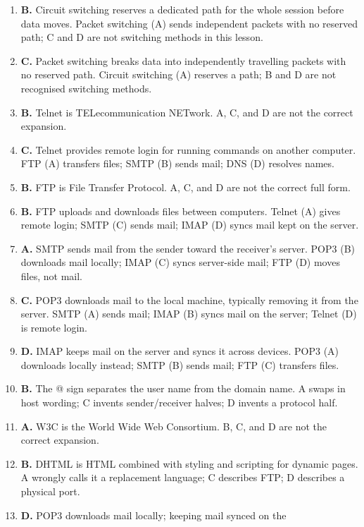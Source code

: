 \begin{enumerate}[label=\textbf{Q\arabic*.}, leftmargin=*]
\item \textbf{B.} Circuit switching reserves a dedicated path for the whole
  session before data moves. Packet switching (A) sends independent packets
  with no reserved path; C and D are not switching methods in this lesson.
\item \textbf{C.} Packet switching breaks data into independently travelling
  packets with no reserved path. Circuit switching (A) reserves a path;
  B and D are not recognised switching methods.
\item \textbf{B.} Telnet is TELecommunication NETwork. A, C, and D are not
  the correct expansion.
\item \textbf{C.} Telnet provides remote login for running commands on
  another computer. FTP (A) transfers files; SMTP (B) sends mail; DNS (D)
  resolves names.
\item \textbf{B.} FTP is File Transfer Protocol. A, C, and D are not the
  correct full form.
\item \textbf{B.} FTP uploads and downloads files between computers. Telnet
  (A) gives remote login; SMTP (C) sends mail; IMAP (D) syncs mail kept on
  the server.
\item \textbf{A.} SMTP sends mail from the sender toward the receiver's
  server. POP3 (B) downloads mail locally; IMAP (C) syncs server-side mail;
  FTP (D) moves files, not mail.
\item \textbf{C.} POP3 downloads mail to the local machine, typically
  removing it from the server. SMTP (A) sends mail; IMAP (B) syncs mail on
  the server; Telnet (D) is remote login.
\item \textbf{D.} IMAP keeps mail on the server and syncs it across devices.
  POP3 (A) downloads locally instead; SMTP (B) sends mail; FTP (C) transfers
  files.
\item \textbf{B.} The @ sign separates the user name from the domain name.
  A swaps in host wording; C invents sender/receiver halves; D invents a
  protocol half.
\item \textbf{A.} W3C is the World Wide Web Consortium. B, C, and D are not
  the correct expansion.
\item \textbf{B.} DHTML is HTML combined with styling and scripting for
  dynamic pages. A wrongly calls it a replacement language; C describes FTP;
  D describes a physical port.
\item \textbf{D.} POP3 downloads mail locally; keeping mail synced on the

\end{enumerate}
